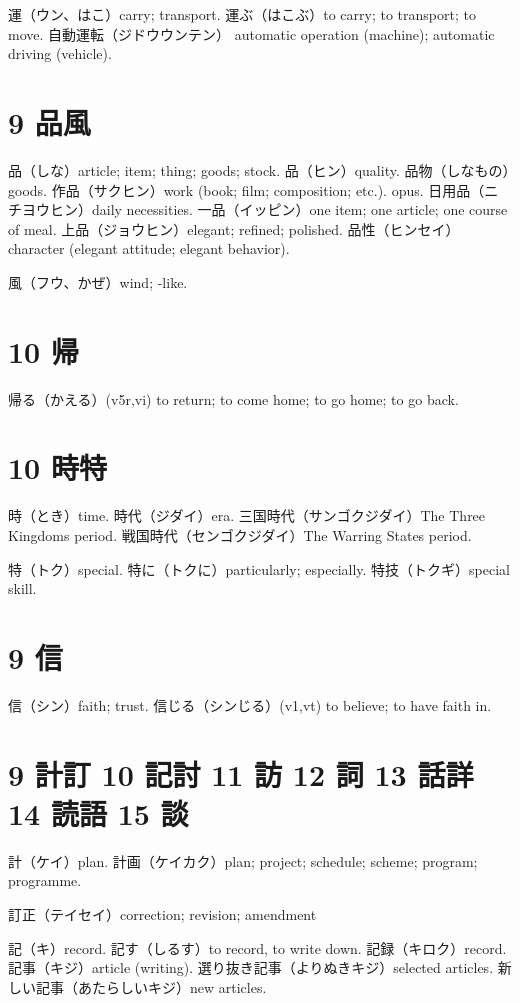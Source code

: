 運（ウン、はこ）carry; transport.
運ぶ（はこぶ）to carry; to transport; to move.
自動運転（ジドウウンテン）
automatic operation (machine); automatic driving (vehicle).

\section{9 品風}

品（しな）article; item; thing; goods; stock.
品（ヒン）quality.
品物（しなもの）goods.
作品（サクヒン）work (book; film; composition; etc.). opus.
日用品（ニチヨウヒン）daily necessities.
一品（イッピン）one item; one article; one course of meal.
上品（ジョウヒン）elegant; refined; polished.
品性（ヒンセイ）character (elegant attitude; elegant behavior).

風（フウ、かぜ）wind; -like.

\section{10 帰}

帰る（かえる）(v5r,vi)
to return; to come home; to go home; to go back.

\section{10 時特}

時（とき）time.
時代（ジダイ）era.
三国時代（サンゴクジダイ）The Three Kingdoms period.
戦国時代（センゴクジダイ）The Warring States period.

特（トク）special.
特に（トクに）particularly; especially.
特技（トクギ）special skill.

\section{9 信}

信（シン）faith; trust.
信じる（シンじる）(v1,vt) to believe; to have faith in.

\section{9 計訂 10 記討 11 訪 12 詞 13 話詳 14 読語 15 談}

計（ケイ）plan.
計画（ケイカク）plan; project; schedule; scheme; program; programme.

訂正（テイセイ）correction; revision; amendment

記（キ）record.
記す（しるす）to record, to write down.
記録（キロク）record.
記事（キジ）article (writing).
選り抜き記事（よりぬきキジ）selected articles.
新しい記事（あたらしいキジ）new articles.

